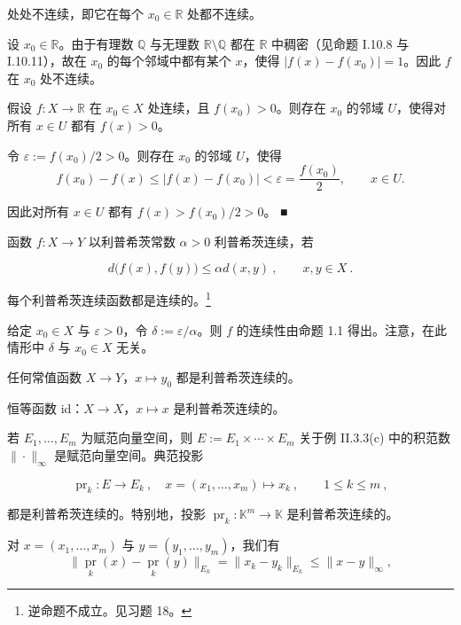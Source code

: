 \begin{example}
\begin{items}
处处不连续，即它在每个 $ x_0 \in \mathbb{R} $ 处都不连续。

\proofhead
设 $ x_0 \in \mathbb{R} $。由于有理数 $ \mathbb{Q} $ 与无理数 $ \mathbb{R} \setminus \mathbb{Q} $ 都在 $ \mathbb{R} $ 中稠密（见命题 I.10.8 与 I.10.11），故在 $ x_0 $ 的每个邻域中都有某个 $ x $，使得 $ |f(x) - f(x_0)| = 1 $。因此 $ f $ 在 $ x_0 $ 处不连续。
\item

假设 $ f: X \to \mathbb{R} $ 在 $ x_0 \in X $ 处连续，且 $ f(x_0) > 0 $。则存在 $ x_0 $ 的邻域 $ U $，使得对所有 $ x \in U $ 都有 $ f(x) > 0 $。

\proofhead
令 $ \varepsilon := f(x_0)/2 > 0 $。则存在 $ x_0 $ 的邻域 $ U $，使得
\[
f(x_{0})-f(x)\leq|f(x)-f(x_{0})|<\varepsilon=\frac{f(x_{0})}{2},\qquad x\in U.
\]

因此对所有 $ x \in U $ 都有 $ f(x) > f(x_0)/2 > 0 $。 ■

\item

函数 $ f: X \to Y $ 以利普希茨常数 $ \alpha > 0 $ 利普希茨连续，若

\[
d\big(f(x),f(y)\big)\leq\alpha d(x,y)~,\qquad x,y\in X~.
\]

每个利普希茨连续函数都是连续的。\footnote{逆命题不成立。见习题 18。}

\proofhead
给定 $ x_0 \in X $ 与 $ \varepsilon > 0 $，令 $ \delta := \varepsilon/\alpha $。则 $ f $ 的连续性由命题 1.1 得出。注意，在此情形中 $ \delta $ 与 $ x_0 \in X $ 无关。
\item

任何常值函数 $ X \to Y $，$ x \mapsto y_0 $ 都是利普希茨连续的。

\item

恒等函数 id：$X \to X$，$x \mapsto x$ 是利普希茨连续的。

\item

若 $ E_1, \ldots, E_m $ 为赋范向量空间，则 $ E := E_1 \times \cdots \times E_m $ 关于例 II.3.3(c) 中的积范数 $ \|\cdot\|_\infty $ 是赋范向量空间。典范投影

\[
\operatorname{pr}_{k}\colon E\to E_{k}~,\quad x=(x_{1},\ldots,x_{m})\mapsto x_{k}~,\qquad1\leq k\leq m~,
\]

都是利普希茨连续的。特别地，投影 $ \operatorname{pr}_k : \mathbb{K}^m \to \mathbb{K} $ 是利普希茨连续的。

\proofhead
对 $ x = (x_1, \ldots, x_m) $ 与 $ y = (y_1, \ldots, y_m) $，我们有
\[
\|\operatorname*{p r}_{k}(x)-\operatorname*{p r}_{k}(y)\|_{E_{k}}=\|x_{k}-y_{k}\|_{E_{k}}\leq\|x-y\|_{\infty},
\]


\end{items}
\end{example}

